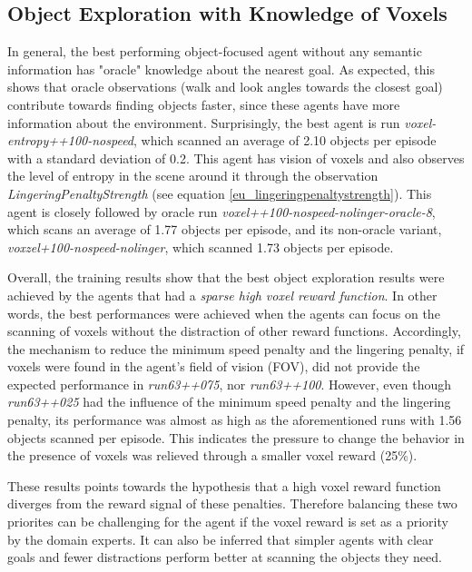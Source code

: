     \subsection{Object Exploration with Knowledge of Voxels} 
        In general, the best performing object-focused agent without any semantic information has "oracle" knowledge about the nearest goal. 
        As expected, this shows that oracle observations (walk and look angles towards the closest goal) contribute towards finding objects faster, since these agents have more information about the environment.
        Surprisingly, the best agent is run \textit{voxel-entropy++100-nospeed}, which scanned an average of 2.10 objects per episode with a standard deviation of 0.2. This agent has vision of voxels and also observes the level of entropy in the scene around it through the observation \textit{LingeringPenaltyStrength} (see equation \ref{eu_lingeringpenaltystrength}).
        This agent is closely followed by oracle run \textit{voxel++100-nospeed-nolinger-oracle-8}, which scans an average of 1.77 objects per episode, and its non-oracle variant, \textit{voxzel+100-nospeed-nolinger}, which scanned 1.73 objects per episode. 
        
        Overall, the training results show that the best object exploration results were achieved by the agents that had a \textit{sparse high voxel reward function}. In other words, the best performances were achieved when the agents can focus on the scanning of voxels without the distraction of other reward functions. 
        Accordingly, the mechanism to reduce the minimum speed penalty and the lingering penalty, if voxels were found in the agent's field of vision (FOV), did not provide the expected performance in \textit{run63++075}, nor \textit{run63++100}.
        However, even though \textit{run63++025} had the influence of the minimum speed penalty and the lingering penalty, its performance was almost as high as the aforementioned runs with 1.56 objects scanned per episode. This indicates the pressure to change the behavior in the presence of voxels was relieved through a smaller voxel reward (25\%).
        
        These results points towards the hypothesis that a high voxel reward function diverges from the reward signal of these penalties. 
        Therefore balancing these two priorites can be challenging for the agent if the voxel reward is set as a priority by the domain experts.
        It can also be inferred that simpler agents with clear goals and fewer distractions perform better at scanning the objects they need. 

